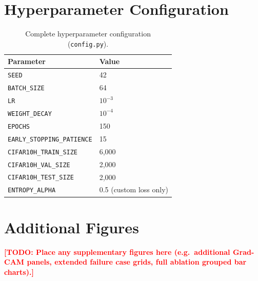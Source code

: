 \documentclass[11pt,a4paper]{article}
\newcommand{\todo}[1]{\textcolor{red}{\textbf{[TODO: #1]}}}
\begin{document}
\printbibliography

\newpage
\appendix

\section{Hyperparameter Configuration}
\label{app:config}

\begin{table}[H]
\centering
\caption{Complete hyperparameter configuration (\texttt{config.py}).}
\label{tab:config}
\begin{tabular}{ll}
\toprule
\textbf{Parameter} & \textbf{Value} \\
\midrule
\texttt{SEED}                     & 42 \\
\texttt{BATCH\_SIZE}               & 64 \\
\texttt{LR}                       & $10^{-3}$ \\
\texttt{WEIGHT\_DECAY}             & $10^{-4}$ \\
\texttt{EPOCHS}                   & 150 \\
\texttt{EARLY\_STOPPING\_PATIENCE} & 15 \\
\texttt{CIFAR10H\_TRAIN\_SIZE}     & 6{,}000 \\
\texttt{CIFAR10H\_VAL\_SIZE}       & 2{,}000 \\
\texttt{CIFAR10H\_TEST\_SIZE}      & 2{,}000 \\
\texttt{ENTROPY\_ALPHA}           & 0.5 (custom loss only) \\
\bottomrule
\end{tabular}
\end{table}

\section{Additional Figures}
\label{app:figs}

\todo{Place any supplementary figures here (e.g.\ additional Grad-CAM panels,
extended failure case grids, full ablation grouped bar charts).}
\end{document}

